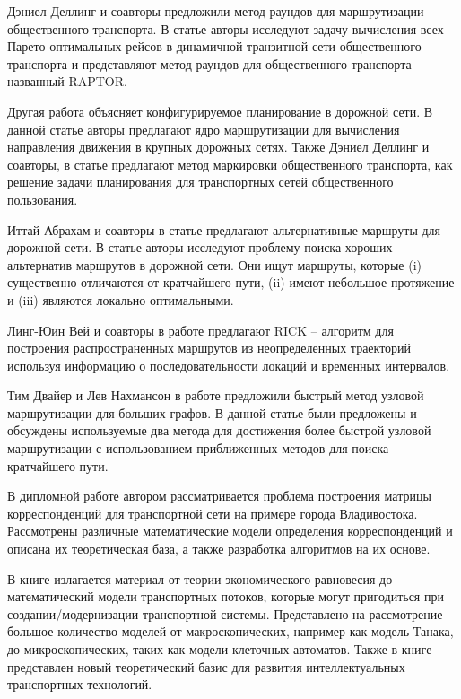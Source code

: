 Дэниел Деллинг и соавторы предложили метод раундов для маршрутизации общественного транспорта. В статье 
\cite{delling2014round} авторы исследуют задачу вычисления всех Парето-оптимальных рейсов в динамичной 
транзитной сети общественного транспорта и представляют метод раундов для общественного транспорта 
названный RAPTOR.

Другая работа \cite{delling2015customizable} объясняет конфигурируемое планирование в дорожной сети. В 
данной статье авторы предлагают ядро маршрутизации для вычисления направления движения в крупных дорожных 
сетях. Также Дэниел Деллинг и соавторы, в статье \cite{delling2015public} предлагают метод маркировки 
общественного транспорта, как решение задачи планирования для транспортных сетей общественного 
пользования.

Иттай Абрахам и соавторы в статье \cite{abraham2013alternative} предлагают альтернативные маршруты для 
дорожной сети. В статье авторы исследуют проблему поиска хороших альтернатив маршрутов в дорожной сети. 
Они ищут маршруты, которые (i) существенно отличаются от кратчайшего пути, (ii) имеют небольшое протяжение 
и (iii) являются локально оптимальными.

Линг-Юин Вей и соавторы в работе \cite{wei2012constructing} предлагают RICK -- алгоритм для построения 
распространенных маршрутов из неопределенных траекторий используя информацию о последовательности локаций
и временных интервалов.

Тим Двайер и Лев Нахмансон в работе \cite{dwyer2009fast} предложили быстрый метод узловой маршрутизации 
для больших графов. В данной статье были предложены и обсуждены используемые два метода для достижения 
более быстрой узловой маршрутизации с использованием приближенных методов для поиска кратчайшего пути.

В дипломной работе \cite{bib:22} автором рассматривается проблема построения матрицы корреспонденций для 
транспортной сети на примере города Владивостока. Рассмотрены различные математические модели определения 
корреспонденций и описана их теоретическая база, а также разработка алгоритмов на их основе.

В книге \cite{bib:23} излагается материал от теории экономического равновесия до математический модели 
транспортных потоков, которые могут пригодиться при создании/модернизации транспортной системы. Представлено 
на рассмотрение большое количество моделей от макроскопических, например как модель Танака, до 
микроскопических, таких как модели клеточных автоматов. Также в книге представлен новый теоретический базис 
для развития интеллектуальных транспортных технологий.

